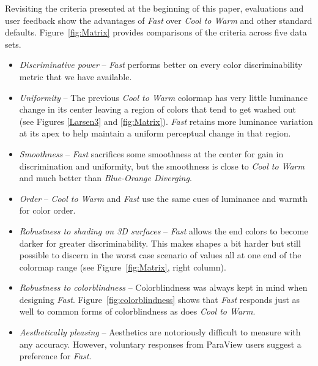 \documentclass{IEEEcsmag}
\newcommand*{\colormap}[1]{\textsl{#1}\xspace}
\newcommand*{\coolwarm}{\colormap{Cool to Warm}}
\newcommand*{\blueorange}{\colormap{Blue-Orange Diverging}}
\newcommand*{\fast}{\colormap{Fast}}
\begin{document}
Revisiting the criteria presented at the beginning of this paper, evaluations and user feedback show the advantages of \fast over \coolwarm and other standard defaults. Figure~\ref{fig:Matrix} provides comparisons of the criteria across five data sets.




\begin{itemize}

\item \emph{Discriminative power} --
  \fast performs better on every color discriminability metric that we have available.
\item \emph{Uniformity} --
  The previous \coolwarm colormap has very little luminance change in its center leaving a region of colors that tend to get washed out (see Figures \ref{Larsen3} and \ref{fig:Matrix}).
  \fast retains more luminance variation at its apex to help maintain a uniform perceptual change in that region.
\item \emph{Smoothness} --
  \fast sacrifices some smoothness at the center for gain in discrimination and uniformity, but the smoothness is close to \coolwarm and much better than \blueorange.
\item \emph{Order} --
  \coolwarm and \fast use the same cues of luminance and warmth for color order.
\item \emph{Robustness to shading on 3D surfaces} --
  \fast allows the end colors to become darker for greater discriminability.
  This makes shapes a bit harder but still possible to discern in the worst case scenario of values all at one end of the colormap range (see Figure~\ref{fig:Matrix}, right column).
\item \emph{Robustness to colorblindness} --
  Colorblindness was always kept in mind when designing \fast.
  Figure~\ref{fig:colorblindness} shows that \fast responds just as well to common forms of colorblindness as does \coolwarm.
\item \emph{Aesthetically pleasing} --
  Aesthetics are notoriously difficult to measure with any accuracy.
  However, voluntary responses from ParaView users suggest a preference for \fast.

\end{itemize}
\end{document}
